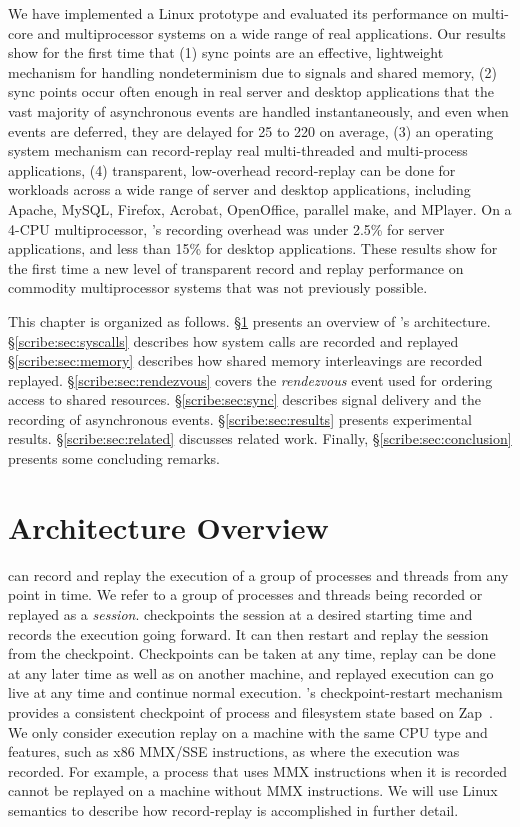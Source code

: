 We have implemented a \scribe{} Linux prototype and evaluated its
performance on multi-core and multiprocessor systems on a wide
range of real applications.  Our results show for the first time that
(1) sync points are an effective, lightweight mechanism for handling
nondeterminism due to signals and shared memory, (2) sync points occur
often enough in real server and desktop applications that the vast
majority of asynchronous events are handled instantaneously, and even
when events are deferred, they are delayed for 25 to 220\us{} on
average, (3) an operating system mechanism can record-replay real
multi-threaded and multi-process applications, (4) transparent,
low-overhead record-replay
can be done for workloads across a wide range of server and
desktop applications, including Apache, MySQL, Firefox, Acrobat,
OpenOffice, parallel make, and MPlayer.  On a 4-CPU multiprocessor,
\scribe{}'s recording overhead was under 2.5\% for server
applications, and less than 15\% for desktop applications.  These
results show for the first time a new level of transparent record and
replay performance on commodity multiprocessor systems that was not
previously possible. 

This chapter is organized as follows.
\S\ref{scribe:sec:arch} presents an overview of \scribe's architecture.
\S\ref{scribe:sec:syscalls} describes how system calls are recorded and replayed
\S\ref{scribe:sec:memory} describes how shared memory interleavings are recorded replayed.
\S\ref{scribe:sec:rendezvous} covers the {\em rendezvous} event used for ordering access to shared resources.
\S\ref{scribe:sec:sync} describes signal delivery and the recording of asynchronous events.
\S\ref{scribe:sec:results} presents experimental results.
\S\ref{scribe:sec:related} discusses related work.
Finally, \S\ref{scribe:sec:conclusion} presents some concluding remarks.

\section{Architecture Overview}
\label{scribe:sec:arch}

\scribe{} can record and replay the execution of a group of processes
and threads from any point in time.  We refer to a group of processes
and threads being recorded or replayed as a {\em session}.  \scribe{}
checkpoints the session at a desired starting time and records the
execution going forward.  It can then restart and replay the
session from the checkpoint.  Checkpoints can be taken at any time,
replay can be done at any later time as well as on another
machine, and replayed execution can go live at any time and continue
normal execution.  \scribe{}'s checkpoint-restart mechanism
provides a consistent checkpoint of process and filesystem state
based on Zap~\cite{dejaview,zap07,zap02}.
We only consider
execution replay on a machine with the same CPU type and features,
such as x86 MMX/SSE instructions, as where the execution was recorded.
For example, a process that uses MMX instructions when it is
recorded cannot be replayed on a machine without MMX instructions.   
We will use Linux semantics to describe how
record-replay is accomplished in further detail.

